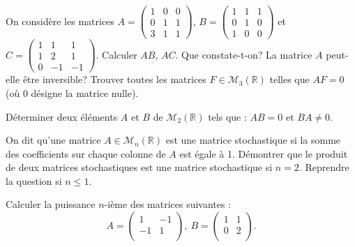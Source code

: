 \documentclass{book}
\begin{document}
\begin{Exercice}[Annulateur]

On considère les matrices $A=\left(\begin{array}{ccc}
1&0&0\\
0&1&1\\
3&1&1\end{array}\right)$, $B=\left(\begin{array}{ccc}
1&1&1\\
0&1&0\\
1&0&0\end{array}\right)$ et $C=\left(\begin{array}{ccc}
1&1&1\\
1&2&1\\
0&-1&-1\end{array}\right)$. Calculer $AB$, $AC$. Que constate-t-on? La matrice $A$ peut-elle être inversible? 
Trouver toutes les matrices $F\in\mathcal M_3(\mathbb R)$ telles que $AF=0$ (où $0$ désigne la matrice nulle).
\end{Exercice}

\begin{Exercice}

Déterminer deux éléments $A$ et $B$ de
$\mathcal M_2({\mathbb R})$ tels que : $AB=0$ et $BA\not = 0$.
\end{Exercice}


\begin{Exercice}
On dit qu'une matrice $A\in\mathcal M_n(\mathbb R)$ est une matrice stochastique si la somme des coefficients
sur chaque colonne de $A$ est égale à 1. Démontrer que le produit de deux matrices stochastiques est
une matrice stochastique si $n=2$. Reprendre la question si $n\leq 1$.
\end{Exercice}

\begin{Exercice}

Calculer la puissance $n$-ième des matrices suivantes : 
$$A=\left(\begin{array}{cc}
1&-1\\
-1&1\\
\end{array}\right),\ B=\left(\begin{array}{cc}
1&1\\
0&2\\
\end{array}\right).$$
\end{Exercice}
\end{document}
